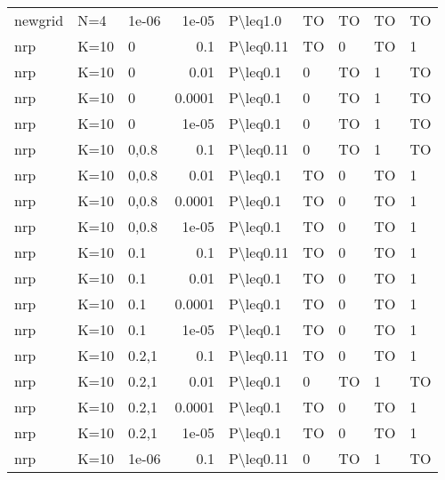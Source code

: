 \begin{longtable}{lllrlllll}
 newgrid       & N=4       & 1e-06 & 1e-05  & P\textbackslash{}leq1.0   & TO   & TO   & TO       & TO      \\
 nrp           & K=10      & 0     & 0.1    & P\textbackslash{}leq0.11  & TO   & 0    & TO       & 1       \\
 nrp           & K=10      & 0     & 0.01   & P\textbackslash{}leq0.1   & 0    & TO   & 1        & TO      \\
 nrp           & K=10      & 0     & 0.0001 & P\textbackslash{}leq0.1   & 0    & TO   & 1        & TO      \\
 nrp           & K=10      & 0     & 1e-05  & P\textbackslash{}leq0.1   & 0    & TO   & 1        & TO      \\
 nrp           & K=10      & 0,0.8 & 0.1    & P\textbackslash{}leq0.11  & 0    & TO   & 1        & TO      \\
 nrp           & K=10      & 0,0.8 & 0.01   & P\textbackslash{}leq0.1   & TO   & 0    & TO       & 1       \\
 nrp           & K=10      & 0,0.8 & 0.0001 & P\textbackslash{}leq0.1   & TO   & 0    & TO       & 1       \\
 nrp           & K=10      & 0,0.8 & 1e-05  & P\textbackslash{}leq0.1   & TO   & 0    & TO       & 1       \\
 nrp           & K=10      & 0.1   & 0.1    & P\textbackslash{}leq0.11  & TO   & 0    & TO       & 1       \\
 nrp           & K=10      & 0.1   & 0.01   & P\textbackslash{}leq0.1   & TO   & 0    & TO       & 1       \\
 nrp           & K=10      & 0.1   & 0.0001 & P\textbackslash{}leq0.1   & TO   & 0    & TO       & 1       \\
 nrp           & K=10      & 0.1   & 1e-05  & P\textbackslash{}leq0.1   & TO   & 0    & TO       & 1       \\
 nrp           & K=10      & 0.2,1 & 0.1    & P\textbackslash{}leq0.11  & TO   & 0    & TO       & 1       \\
 nrp           & K=10      & 0.2,1 & 0.01   & P\textbackslash{}leq0.1   & 0    & TO   & 1        & TO      \\
 nrp           & K=10      & 0.2,1 & 0.0001 & P\textbackslash{}leq0.1   & TO   & 0    & TO       & 1       \\
 nrp           & K=10      & 0.2,1 & 1e-05  & P\textbackslash{}leq0.1   & TO   & 0    & TO       & 1       \\
 nrp           & K=10      & 1e-06 & 0.1    & P\textbackslash{}leq0.11  & 0    & TO   & 1        & TO      \\

\end{longtable}
